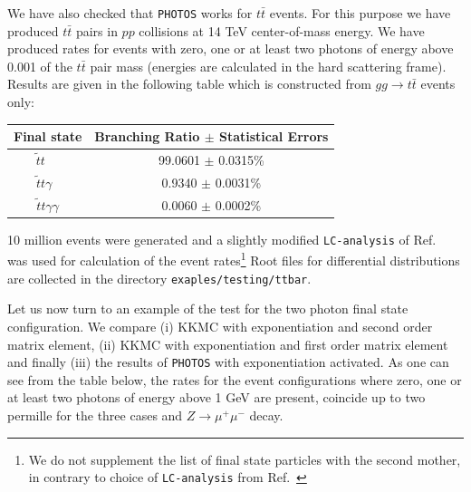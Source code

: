 \documentclass[]{Photos_interface_design}
\begin{document}
We have also checked that {\tt PHOTOS} works for $t \bar t$ events.
For this purpose we have produced $t \bar t$ pairs in $pp$ collisions at 
14 TeV center-of-mass energy. We have produced rates for events with zero, one or
at least two photons of energy above 0.001 of the $t \bar t$ pair mass
(energies are calculated in  the hard scattering frame).
Results are given in the following table which is constructed from  
$gg \to t \bar t$ events only:

\vspace{0.3cm} 
\begin{center}
{ \begin{tabular}{c c} 
\toprule 
Final state &  Branching Ratio  $\pm$ Statistical Errors \\  
\midrule
{$ \widetilde{t} t \; \;\; \;$}  &  {99.0601 $\pm$ 0.0315\%}  \\ 
 {$  \widetilde{t} t \gamma \;\;$} &   { 0.9340 $\pm$  0.0031\%}   \\ 
{$  \widetilde{t} t \gamma \gamma$}  &  { 0.0060 $\pm$  0.0002\%}  \\ 
\bottomrule
\end{tabular} 
}  
\end{center} 

10 million events were generated and a slightly modified {\tt LC-analysis} of Ref.~\cite{Golonka:2002rz}
was used for calculation of the event rates\footnote{  We do not supplement the list of 
final state particles with the second mother, in contrary to choice of {\tt LC-analysis} from  Ref.~\cite{Golonka:2002rz} } Root files for 
differential distributions are 
collected in the directory {\tt exaples/testing/ttbar}. 

Let us now turn to an example of the test for the two photon final state configuration.
We compare (i) KKMC \cite{kkcpc:1999} with exponentiation and second order matrix element, (ii) KKMC with exponentiation and first order matrix element
and finally (iii) the results of {\tt PHOTOS} with exponentiation activated. As one can see from the table below, the rates for the event configurations 
where zero, one or at least two photons of energy above 1 GeV are present, coincide up to two
permille for the three cases and $Z\to \mu^+\mu^-$ decay. 
\end{document}
